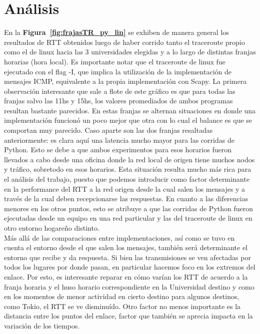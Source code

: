 \section{Análisis}

En la \textbf{Figura~\ref{fig:frajasTR_py_lin}} se exhiben de manera general los resultados de RTT obtenidos luego de haber corrido tanto el traceroute propio como el de linux hacia las 3 universidades elegidas y a lo largo de distintas franjas horarias (hora local). Es importante notar que el traceroute de linux fue ejecutado con el flag -I, que implica la utilización de la implementación de mensajes ICMP, equivalente a la propia implementación con Scapy. La primera observación interesante que sale a flote de este gráfico es que para todas las franjas salvo las 11hs y 15hs, los valores promediados de ambos programas resultan bastante parecidos. En estas franjas se alternan situaciones en donde una implementación funcionó un poco mejor que otra con lo cual el balance es que se comportan muy parecido. Caso aparte son las dos franjas resaltadas anteriormente: es clara aquí una latencia mucho mayor para las corridas de Python. Esto se debe a que ambos experimentos para esos horarios fueron llevados a cabo desde una oficina donde la red local de origen tiene muchos nodos y tráfico, sobretodo en esos horarios. Esta situación resulta mucho más rica para el análisis del trabajo, puesto que podemos introducir como factor determinante en la performance del RTT a la red origen desde la cual salen los mensajes y a través de la cual deben recepcionarse las respuestas. En cuanto a las diferencias menores en los otros puntos, esto se atribuye a que las corridas de Python fueron ejecutadas desde un equipo en una red particular y las del traceroute de linux en otro entorno hogareño distinto.\\
\indent Más allá de las comparaciones entre implementaciones, así como se tuvo en cuenta el entorno desde el que salen los mensajes, también será determinante el entorno que recibe y da respuesta. Si bien las transmisiones se ven afectadas por todos los lugares por donde pasan, en particular hacemos foco en los extremos del enlace. Por esto, es interesante reparar en cómo varían los RTT de acuerdo a la franja horaria y el huso horario correspondiente en la Universidad destino y como en los momentos de menor actividad en cierto destino para algunos destinos, como Tokio, el RTT se ve disminuído. Otro factor no menos importante es la distancia entre los puntos del enlace, factor que también se aprecia impacta en la variación de los tiempos.\\
